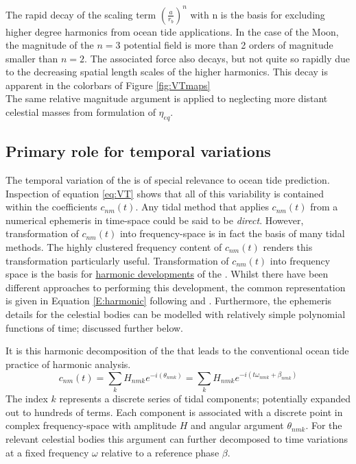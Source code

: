 The rapid decay of the scaling term $\left(\frac{a}{r_b} \right)^n$ with n is the basis for excluding higher degree harmonics from ocean tide applications.  In the case of the Moon, the magnitude of the $n=3$ potential field is more than 2 orders of magnitude smaller than $n=2$.  The associated force also decays, but not quite so rapidly due to the decreasing spatial length scales of the higher harmonics.  This decay is apparent in the colorbars of Figure \ref{fig:VTmaps}\\
The same relative magnitude argument is applied to neglecting more distant celestial masses from formulation of $\eta_{eq}$.

\subsection{Primary role for temporal variations}
\label{sec:temporal}
The temporal variation of the \ATGP{} is of special relevance to ocean tide prediction.  Inspection of equation \ref{eq:VT} shows that all of this variability is contained within the coefficients $c_{nm}(t)$.  
Any tidal method that applies $c_{nm}(t)$ from a numerical ephemeris in time-space could be said to be \emph{direct}. 
However, transformation of $c_{nm}(t)$ into frequency-space is in fact the basis of many tidal methods.   The highly clustered frequency content of $c_{nm}(t)$ renders this transformation particularly useful.  
Transformation of $c_{nm}(t)$ into frequency space is the basis for \underline{harmonic developments} of the \ATGP{}. Whilst there have been different approaches to performing this development, the common representation is given in Equation \ref{E:harmonic} following \citet{Desai:2006wo} and \citet[Eq 13]{Cartwright:1971iz}.
Furthermore, the ephemeris details for the celestial bodies can be modelled with relatively simple polynomial functions of time; discussed further below. 


It is this harmonic decomposition of the \ATGP{} that leads to the conventional ocean tide practice of harmonic analysis.
\begin{equation}
    c_{nm}(t) = \sum_{k} H_{nmk} e^{-i(\theta_{nmk})} = \sum_{k} H_{nmk} e^{-i( t\omega_{nmk} + \beta_{nmk})}
    \label{E:harmonic}
\end{equation}
The index $k$ represents a discrete series of tidal components; potentially expanded out to hundreds of terms.  Each component is associated with a discrete point in complex frequency-space with amplitude $H$ and angular argument $\theta_{nmk}$.   For the relevant celestial bodies this argument can further decomposed to time variations at a fixed frequency $\omega$ relative to a reference phase $\beta$.  

